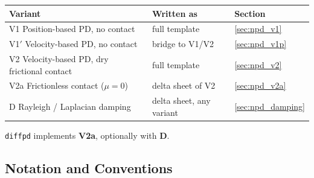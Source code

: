 \begin{center}
\begin{tabular}{lll}
\textbf{Variant} & \textbf{Written as} & \textbf{Section} \\ \hline
V1 \;\; Position-based PD, no contact          & full template     & \ref{sec:npd_v1} \\
V1$'$ Velocity-based PD, no contact            & bridge to V1/V2   & \ref{sec:npd_v1p} \\
V2 \;\; Velocity-based PD, dry frictional contact & full template  & \ref{sec:npd_v2} \\
V2a\; Frictionless contact ($\mu = 0$)         & delta sheet of V2 & \ref{sec:npd_v2a} \\
D \;\;\; Rayleigh / Laplacian damping          & delta sheet, any variant & \ref{sec:npd_damping} \\
\end{tabular}
\end{center}
\noindent \texttt{diffpd} implements \textbf{V2a}, optionally with \textbf{D}.

\subsection{Notation and Conventions}
\label{sec:npd_notation}

